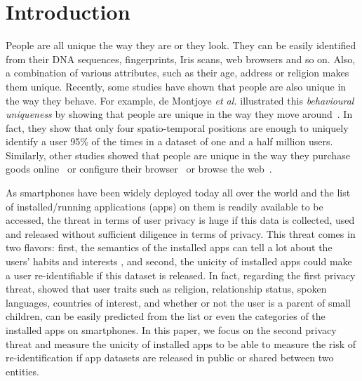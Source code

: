 \documentclass{acm_proc_article-sp}
\theoremstyle{plain}
\theoremstyle{plain}
\theoremstyle{plain}
\theoremstyle{plain}
\theoremstyle{plain}
\theoremstyle{plain}
\begin{document}
\section{Introduction}
\label{sec:intro}



People are all unique the way they are or they look. 
They can be easily identified from their DNA sequences, fingerprints, Iris scans, web browsers and so on. 
Also, a combination of various attributes, such as their age, address or religion \cite{Sweeney2001} makes them unique.
Recently, some studies have shown that people are also unique in the way they behave.
For example, de Montjoye \emph{et al.} illustrated this \emph{behavioural uniqueness} by showing that people are unique in the way they move around~\cite{Nature13}. 
In fact, they show that only four spatio-temporal positions are enough to uniquely identify a user 95\% of the times in a dataset of one and a half million users. 
Similarly, other studies showed that people are unique in the way they purchase goods online~\cite{Science15} or configure their browser~\cite{Eckersley10} or browse the web~\cite{Olejnik13}. 










As smartphones have been widely deployed today all over the world and the list of installed/running applications (apps) on them is readily available to be accessed, the threat in terms of user privacy is huge if this data is collected, used and released without sufficient diligence in terms of privacy.
This threat comes in two flavors: first, the semantics of the installed apps can tell a lot about the users' habits and interests \cite{Seneviratne:2014}, and second, the unicity of installed apps could make a user re-identifiable if this dataset is released.
In fact, regarding the first privacy threat, \cite{Seneviratne:2014} showed that user traits such as religion, relationship status, spoken languages, countries of interest, and whether or not the user is a parent of small children, can be easily predicted from the list or even the categories of the installed apps on smartphones.
In this paper, we focus on the second privacy threat and measure the unicity of installed apps to be able to measure the risk of re-identification if app datasets are released in public or shared between two entities.
\end{document}
